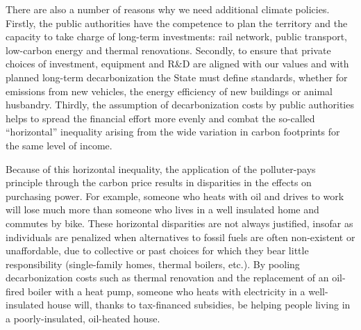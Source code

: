\documentclass[a5paper,english,openany]{memoir}
\begin{document}
There are also a number of reasons why we need additional climate policies. %
Firstly, the public authorities have the competence to plan the territory and the capacity to take charge of long-term investments: rail network, public transport, low-carbon energy and thermal renovations. %
Secondly, to ensure that private choices of investment, equipment and R\&D %
are aligned with our values and with planned long-term decarbonization %
the State must define standards, whether for emissions from new vehicles, the energy efficiency of new buildings or animal husbandry. %
Thirdly, the assumption of decarbonization %
costs by public authorities helps to spread the financial effort more evenly and combat the so-called ``horizontal'' inequality arising from the wide variation in carbon footprints for the same level of income. %

Because of this horizontal inequality, the application of the polluter-pays principle through the carbon price results in disparities in the effects on purchasing power. For example, %
someone who heats with oil and drives to work will lose much more than someone who lives in a well insulated home and commutes by bike. 
These horizontal disparities are not always justified, insofar as individuals are penalized %
when alternatives to fossil fuels are often non-existent or unaffordable, due to collective or past choices for which they bear little responsibility (single-family homes, thermal boilers, etc.). By pooling decarbonization %
costs such as thermal renovation and the replacement of an oil-fired boiler with a heat pump, someone who heats with electricity in a well-insulated house will, thanks to tax-financed subsidies, be helping people living in a poorly-insulated, oil-heated house. 
\end{document}
